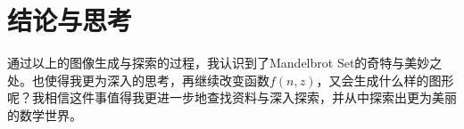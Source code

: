 \documentclass[a4paper]{ctexart}
\begin{document}
\section{结论与思考}
通过以上的图像生成与探索的过程，我认识到了Mandelbrot Set的奇特与美妙之处。也使得我更为深入的思考，再继续改变函数$f(n,z)$，又会生成什么样的图形呢？我相信这件事值得我更进一步地查找资料与深入探索，并从中探索出更为美丽的数学世界。
\clearpage
	


	
\end{document}
